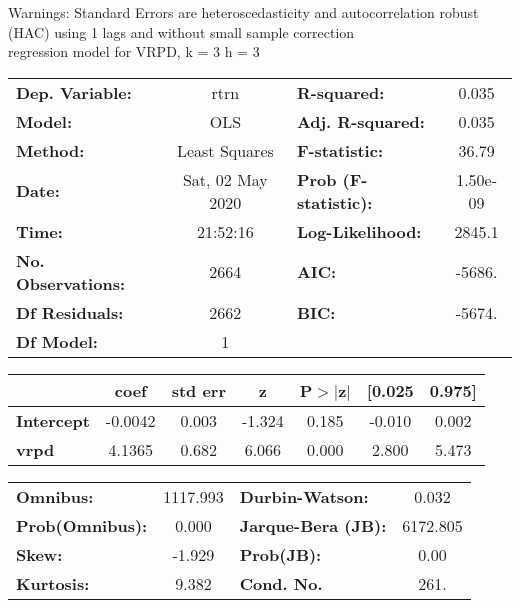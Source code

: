 Warnings: \newline
 [1] Standard Errors are heteroscedasticity and autocorrelation robust (HAC) using 1 lags and without small sample correction\\ 

regression model for VRPD, k = 3 h = 3\begin{center}
\begin{tabular}{lclc}
\toprule
\textbf{Dep. Variable:}    &       rtrn       & \textbf{  R-squared:         } &     0.035   \\
\textbf{Model:}            &       OLS        & \textbf{  Adj. R-squared:    } &     0.035   \\
\textbf{Method:}           &  Least Squares   & \textbf{  F-statistic:       } &     36.79   \\
\textbf{Date:}             & Sat, 02 May 2020 & \textbf{  Prob (F-statistic):} &  1.50e-09   \\
\textbf{Time:}             &     21:52:16     & \textbf{  Log-Likelihood:    } &    2845.1   \\
\textbf{No. Observations:} &        2664      & \textbf{  AIC:               } &    -5686.   \\
\textbf{Df Residuals:}     &        2662      & \textbf{  BIC:               } &    -5674.   \\
\textbf{Df Model:}         &           1      & \textbf{                     } &             \\
\bottomrule
\end{tabular}
\begin{tabular}{lcccccc}
                   & \textbf{coef} & \textbf{std err} & \textbf{z} & \textbf{P$> |$z$|$} & \textbf{[0.025} & \textbf{0.975]}  \\
\midrule
\textbf{Intercept} &      -0.0042  &        0.003     &    -1.324  &         0.185        &       -0.010    &        0.002     \\
\textbf{vrpd}      &       4.1365  &        0.682     &     6.066  &         0.000        &        2.800    &        5.473     \\
\bottomrule
\end{tabular}
\begin{tabular}{lclc}
\textbf{Omnibus:}       & 1117.993 & \textbf{  Durbin-Watson:     } &    0.032  \\
\textbf{Prob(Omnibus):} &   0.000  & \textbf{  Jarque-Bera (JB):  } & 6172.805  \\
\textbf{Skew:}          &  -1.929  & \textbf{  Prob(JB):          } &     0.00  \\
\textbf{Kurtosis:}      &   9.382  & \textbf{  Cond. No.          } &     261.  \\
\bottomrule
\end{tabular}
\end{center}

